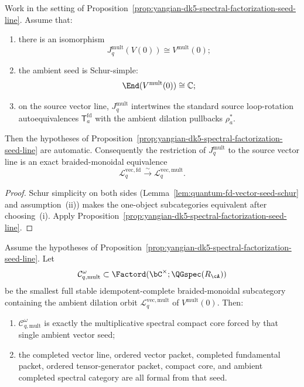 \begin{corollary}
\label{cor:yangian-dk5-spectral-factorization-schur-seed-line}
Work in the setting of
Proposition~\ref{prop:yangian-dk5-spectral-factorization-seed-line}.
Assume that:
\begin{enumerate}[label=\textup{(\roman*)}]
\item there is an isomorphism
  \[
  J_q^{\mathrm{mult}}(V(0))\cong V^{\mathrm{mult}}(0);
  \]
\item the ambient seed is Schur-simple:
  \[
  \End(V^{\mathrm{mult}}(0))\cong \mathbb C;
  \]
\item on the source vector line,
  \(J_q^{\mathrm{mult}}\) intertwines the standard source loop-rotation
  autoequivalences \(\mathsf T_a^{\mathrm{fd}}\) with the ambient
  dilation pullbacks \(\rho_a^*\).
\end{enumerate}
Then the hypotheses of
Proposition~\ref{prop:yangian-dk5-spectral-factorization-seed-line}
are automatic.  Consequently the restriction of \(J_q^{\mathrm{mult}}\)
to the source vector line is an exact braided-monoidal equivalence
\[
\mathcal L_q^{\mathrm{vec,fd}}
\xrightarrow{\sim}
\mathcal L_q^{\mathrm{vec,mult}}.
\]

\end{corollary}

\begin{proof}
Schur simplicity on both sides
(Lemma~\ref{lem:quantum-fd-vector-seed-schur} and
assumption~\textup{(ii)}) makes the one-object subcategories
equivalent after choosing~\textup{(i)}.  Apply
Proposition~\ref{prop:yangian-dk5-spectral-factorization-seed-line}.
\end{proof}

\begin{corollary}
\label{cor:yangian-dk5-spectral-factorization-ambient-one-seed}
Assume the hypotheses of
Proposition~\ref{prop:yangian-dk5-spectral-factorization-seed-line}.
Let
\[
\mathcal C_{q,\mathrm{mult}}^\omega
\subset
\Factord(\bC^\times;\QGspec(R_{\cA}))
\]
be the smallest full stable idempotent-complete braided-monoidal
subcategory containing the ambient dilation orbit
\(\mathcal L_q^{\mathrm{vec,mult}}\) of \(V^{\mathrm{mult}}(0)\).
Then:
\begin{enumerate}[label=\textup{(\alph*)}]
\item \(\mathcal C_{q,\mathrm{mult}}^\omega\) is exactly the
  multiplicative spectral compact core forced by that single ambient
  vector seed;
\item the completed vector line, ordered vector packet, completed
  fundamental packet, ordered tensor-generator packet, compact core,
  and ambient completed spectral category are all formal from that
  seed.
\end{enumerate}

\end{corollary}

